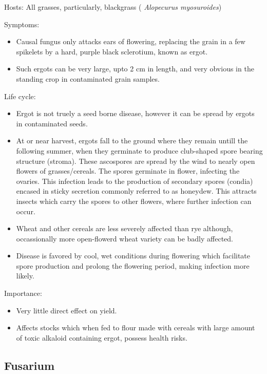 \documentclass[
  openany]{book}
\providecommand{\tightlist}{%
  \setlength{\itemsep}{0pt}\setlength{\parskip}{0pt}}
\begin{document}
Hosts:
All grasses, particularly, blackgrass ( \emph{Alopecurus myosuroides})

Symptoms:

\begin{itemize}
\tightlist
\item
  Causal fungus only attacks ears of flowering, replacing the grain in a few spikelets by a hard, purple black sclerotium, known as ergot.
\item
  Such ergots can be very large, upto 2 cm in length, and very obvious in the standing crop in contaminated grain samples.
\end{itemize}

Life cycle:

\begin{itemize}
\tightlist
\item
  Ergot is not truely a seed borne disease, however it can be spread by ergots in contaminated seeds.
\item
  At or near harvest, ergots fall to the ground where they remain untill the following summer, when they germinate to produce club-shaped spore bearing structure (stroma). These ascospores are spread by the wind to nearly open flowers of grasses/cereals. The spores germinate in flower, infecting the ovaries. This infection leads to the production of secondary spores (condia) encased in sticky secretion commonly referred to as honeydew. This attracts insects which carry the spores to other flowers, where further infection can occur.
\item
  Wheat and other cereals are less severely affected than rye although, occassionally more open-flowerd wheat variety can be badly affected.
\item
  Disease is favored by cool, wet conditions during flowering which facilitate spore production and prolong the flowering period, making infection more likely.
\end{itemize}

Importance:

\begin{itemize}
\tightlist
\item
  Very little direct effect on yield.
\item
  Affects stocks which when fed to flour made with cereals with large amount of toxic alkaloid containing ergot, possess health risks.
\end{itemize}

\hypertarget{fusarium}{%
\subsection{Fusarium}\label{fusarium}}
\end{document}
